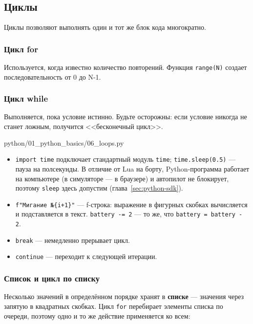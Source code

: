 \subsection{Циклы}

Циклы позволяют выполнять один и тот же блок кода многократно.

\subsubsection*{Цикл for}
Используется, когда известно количество повторений. Функция \texttt{range(N)} создает последовательность от 0 до N-1.

\subsubsection*{Цикл while}
Выполняется, пока условие истинно. Будьте осторожны: если условие никогда не станет ложным, получится <<бесконечный цикл>>.

\begin{codefile}[python]{python/01_python_basics/06_loops.py}
\end{codefile}

\begin{itemize}
    \item \texttt{import time} подключает стандартный модуль \texttt{time}; \texttt{time.sleep(0.5)} --- пауза на полсекунды. В отличие от Lua на борту, Python-программа работает на компьютере (в симуляторе --- в браузере) и автопилот не блокирует, поэтому \texttt{sleep} здесь допустим (глава~\ref{sec:python-sdk}).
    \item \texttt{f"Мигание №\{i+1\}"} --- f-строка: выражение в фигурных скобках вычисляется и подставляется в текст. \texttt{battery -= 2} --- то же, что \texttt{battery = battery - 2}.
    \item \texttt{break} — немедленно прерывает цикл.
    \item \texttt{continue} — переходит к следующей итерации.
\end{itemize}

\subsubsection*{Список и цикл по списку}
Несколько значений в определённом порядке хранят в \textbf{списке} --- значения через запятую в квадратных скобках. Цикл \texttt{for} перебирает элементы списка по очереди, поэтому одно и то же действие применяется ко всем:

